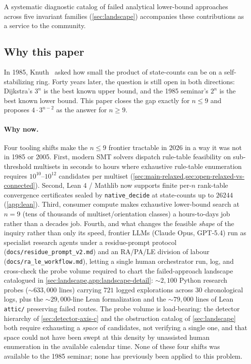 \documentclass[11pt,a4paper]{article}
\theoremstyle{plain}
\theoremstyle{definition}
\begin{document}
A systematic diagnostic catalog of failed analytical lower-bound
approaches across five invariant families (\cref{sec:landscape})
accompanies these contributions as a service to the community.

\subsection{Why this paper}\label{sec:intro-why}

In 1985, Knuth~\cite{HaddadKnuth1985} asked how small the product of
state-counts can be on a self-stabilizing ring.  Forty years later,
the question is still open in both directions: Dijkstra's $3^n$ is
the best known upper bound, and the 1985 seminar's $2^n$ is the
best known lower bound.  This paper closes the gap exactly for
$n \le 9$ and proposes $4 \cdot 3^{n-2}$ as the answer for
$n \ge 9$.

\paragraph{Why now.}  Four tooling shifts make the $n \le 9$
frontier tractable in 2026 in a way it was not in 1985 or 2005.
First, modern SMT solvers dispatch rule-table feasibility on
sub-threshold multisets in seconds to hours where exhaustive
rule-table enumeration requires $10^{10}$--$10^{12}$ candidates
per multiset (\cref{sec:main-relaxed,sec:open-relaxed-vs-connected}).
Second, Lean 4 / Mathlib now supports finite per-$n$ rank-table
convergence certificates sealed by \texttt{native\_decide} at
state-counts up to $26244$ (\cref{app:lean}).  Third, consumer
compute makes exhaustive lower-bound search at $n = 9$
(tens of thousands of multiset/orientation classes) a
hours-to-days job rather than a decades job.  Fourth, and what
changes the feasible \emph{shape} of the inquiry rather than only
its speed, frontier LLMs (Claude Opus, GPT-5.4) run as
specialist research agents under a residue-prompt protocol
(\texttt{docs/residue\_prompt\_v2.md}) and an RA/PA/LE division
of labour (\texttt{docs/ra\_le\_workflow.md}), letting a single
human orchestrator run, log, and cross-check the probe volume
required to chart the failed-approach landscape catalogued in
\cref{sec:landscape,app:landscape-detail}: $\sim\!2{,}100$ Python
research probes ($\sim\!633{,}000$ lines) carrying $721$ logged
explorations across $30$ chronological logs, plus the
$\sim\!29{,}000$-line Lean formalization and the $\sim\!79{,}000$
lines of Lean \texttt{attic/} preserving failed routes.  The probe
volume is load-bearing: the detector hierarchy of
\cref{sec:detector-axis-c} and the obstruction catalog of
\cref{sec:landscape} both require exhausting a \emph{space} of
candidates, not verifying a single one, and that space could not
have been swept at this density by unassisted human enumeration in
the available calendar time.  None of these four shifts was
available to the 1985 seminar; none has previously been applied
to this problem.
\end{document}
